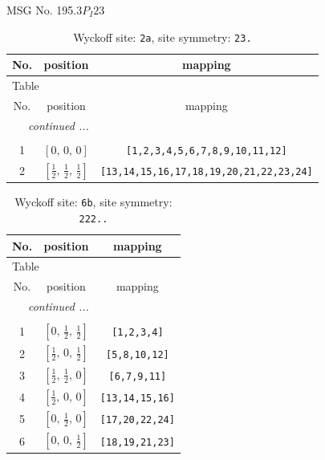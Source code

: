 \documentclass[fleqn,8pt]{jsarticle}
\begin{document}
\setcounter{MaxMatrixCols}{32}

\renewcommand{\tablename}{Table~}
\renewcommand{\figurename}{Figure~}
\begin{center}
\LARGE
MSG No. 195.3\quad$P_{I}23$
\end{center}
\renewcommand{\arraystretch}{1.2}
\begin{longtable}{ccc}
\caption{Wyckoff site: {\tt 2a}, site symmetry: {\tt 23.}}
 \\
 \hline \hline
No. & position & mapping \\ \hline \endfirsthead

\multicolumn{2}{l}{\tablename\ \thetable{}} \\
 \hline \hline
No. & position & mapping \\ \hline \endhead

 \hline \hline
\multicolumn{2}{r}{\footnotesize\it continued ...} \\ \endfoot

 \hline \hline
\multicolumn{2}{r}{} \\ \endlastfoot

1 & $\left[ 0,\, 0,\, 0 \right]$ & {\tt [1,2,3,4,5,6,7,8,9,10,11,12]} \\ \hline
2 & $\left[ \frac{1}{2},\, \frac{1}{2},\, \frac{1}{2} \right]$ & {\tt [13,14,15,16,17,18,19,20,21,22,23,24]} \\
\end{longtable}
\renewcommand{\arraystretch}{1.2}
\begin{longtable}{ccc}
\caption{Wyckoff site: {\tt 6b}, site symmetry: {\tt 222..}}
 \\
 \hline \hline
No. & position & mapping \\ \hline \endfirsthead

\multicolumn{2}{l}{\tablename\ \thetable{}} \\
 \hline \hline
No. & position & mapping \\ \hline \endhead

 \hline \hline
\multicolumn{2}{r}{\footnotesize\it continued ...} \\ \endfoot

 \hline \hline
\multicolumn{2}{r}{} \\ \endlastfoot

1 & $\left[ 0,\, \frac{1}{2},\, \frac{1}{2} \right]$ & {\tt [1,2,3,4]} \\ \hline
2 & $\left[ \frac{1}{2},\, 0,\, \frac{1}{2} \right]$ & {\tt [5,8,10,12]} \\ \hline
3 & $\left[ \frac{1}{2},\, \frac{1}{2},\, 0 \right]$ & {\tt [6,7,9,11]} \\ \hline
4 & $\left[ \frac{1}{2},\, 0,\, 0 \right]$ & {\tt [13,14,15,16]} \\ \hline
5 & $\left[ 0,\, \frac{1}{2},\, 0 \right]$ & {\tt [17,20,22,24]} \\ \hline
6 & $\left[ 0,\, 0,\, \frac{1}{2} \right]$ & {\tt [18,19,21,23]} \\
\end{longtable}
\end{document}
